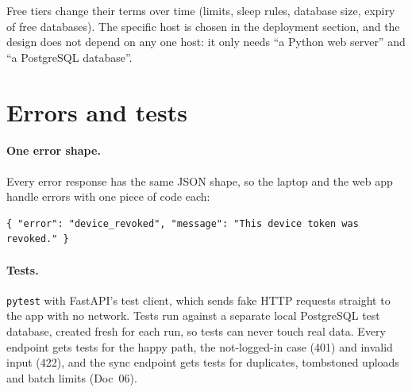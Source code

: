 \documentclass[11pt,a4paper]{article}
\begin{document}
\begin{caution}
Free tiers change their terms over time (limits, sleep rules, database size, expiry of free
databases). The specific host is chosen in the deployment section, and the design does not
depend on any one host: it only needs ``a Python web server'' and ``a PostgreSQL database''.
\end{caution}

\section{Errors and tests}

\paragraph{One error shape.} Every error response has the same JSON shape, so the laptop and the
web app handle errors with one piece of code each:
\begin{lstlisting}
{ "error": "device_revoked", "message": "This device token was revoked." }
\end{lstlisting}

\paragraph{Tests.} \texttt{pytest} with FastAPI's test client, which sends fake HTTP requests
straight to the app with no network. Tests run against a separate local PostgreSQL test
database, created fresh for each run, so tests can never touch real data. Every endpoint gets
tests for the happy path, the not-logged-in case (401) and invalid input (422), and the sync
endpoint gets tests for duplicates, tombstoned uploads and batch limits (Doc~06).

\end{document}
